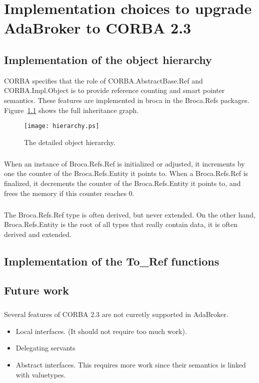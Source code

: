 \chapter{Implementation choices to upgrade AdaBroker to CORBA 2.3}

\section{Implementation of the object hierarchy}
CORBA specifies that the role of CORBA.AbstractBase.Ref and
CORBA.Impl.Object is to provide reference counting and smart pointer
semantics. These features are implemented in broca in the Broca.Refs
packages. Figure~\ref{fig::detailed_hierarchy} shows the
full inheritance graph.


\vspace{2mm}
\begin{figure}[!htbp]
    \texttt{[image: hierarchy.ps]}
  \caption{The detailed object hierarchy.}
  \label{fig::detailed_hierarchy}
\end{figure}


\paragraph{}When an instance of Broca.Refs.Ref is initialized or
adjusted, it increments by one the counter of the Broca.Refs.Entity it
points to. When a Broca.Refs.Ref is finalized, it decrements the
counter of the Broca.Refs.Entity it points to, and frees the memory if
this counter reaches 0.

\paragraph{}The Broca.Refs.Ref type is often derived, but never
extended. On the other hand, Broca.Refs.Entity is the root of all
types that really contain data, it is often derived and extended.

\section{Implementation of the To\_Ref functions}



\section{Future work}

\paragraph{}Several features of CORBA 2.3 are not curretly supported
in AdaBroker.

\begin{itemize}
\item Local interfaces. (It should not require too much work).
\item Delegating servants
\item Abstract interfaces. This requires more work since their
semantics is linked with valuetypes.
\end{itemize}
